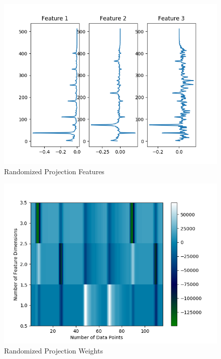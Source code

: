 \documentclass{article}[12pt]
\begin{document}
   \begin{figure}[ht]
   \centerline{
   \includegraphics[scale=1.0]{p1/randproj_features_sound.png}}
   \caption{Randomized Projection Features}
   \label{fig:rp_f}
   \end{figure}
   
   \begin{figure}[ht]
   \centerline{
   \includegraphics[scale=1.0]{p1/randproj_weights_sound.png}}
   \caption{Randomized Projection Weights}
   \label{fig:rp_w}
   \end{figure}  
\end{document}
